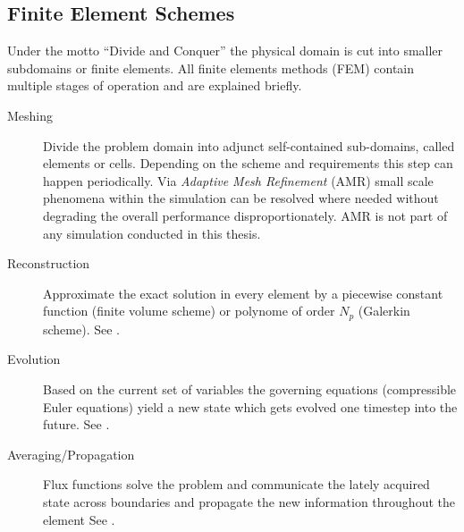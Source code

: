 \subsection{Finite Element Schemes}

Under the motto ``Divide and Conquer'' the physical domain is cut into smaller
subdomains or finite elements.  All finite elements methods (FEM) contain
multiple stages of operation and are explained briefly.

\begin{description}
\item [Meshing] Divide the problem domain into adjunct self-contained
sub-domains, called elements or cells. Depending on the scheme and requirements
this step can happen periodically. Via \emph{Adaptive Mesh Refinement} (AMR) small
scale phenomena within the simulation can be resolved where needed without
degrading the overall performance disproportionately. AMR is not part of
any simulation conducted in this thesis.

\item [Reconstruction] Approximate the exact solution in every element by a
piecewise constant function (finite volume scheme) or polynome of order $N_p$
(Galerkin scheme). See .

\item [Evolution] Based on the current set of variables the governing equations
(compressible Euler equations) yield a new state which gets evolved one
timestep into the future. See .

\item [Averaging/Propagation] Flux functions solve the  problem
and communicate the lately acquired state across boundaries and propagate the
new information throughout the element See .
\end{description}




